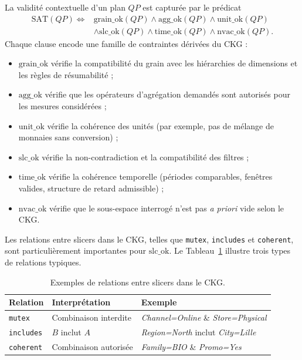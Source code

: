 \documentclass[journal]{IEEEtran}
\begin{document}
La validité contextuelle d'un plan $QP$ est capturée par le prédicat
\begin{equation}
\label{eq:sat}
\begin{aligned}
\mathrm{SAT}(QP) \Leftrightarrow {} & \mathrm{grain\_ok}(QP)\wedge \mathrm{agg\_ok}(QP)\wedge \mathrm{unit\_ok}(QP) \\
& \wedge \mathrm{slc\_ok}(QP)\wedge \mathrm{time\_ok}(QP)\wedge \mathrm{nvac\_ok}(QP).
\end{aligned}
\end{equation}
Chaque clause encode une famille de contraintes dérivées du CKG :
\begin{itemize}
  \item $\mathrm{grain\_ok}$ vérifie la compatibilité du grain avec les hiérarchies de dimensions et les règles de résumabilité ;
  \item $\mathrm{agg\_ok}$ vérifie que les opérateurs d'agrégation demandés sont autorisés pour les mesures considérées ;
  \item $\mathrm{unit\_ok}$ vérifie la cohérence des unités (par exemple, pas de mélange de monnaies sans conversion) ;
  \item $\mathrm{slc\_ok}$ vérifie la non-contradiction et la compatibilité des filtres ;
  \item $\mathrm{time\_ok}$ vérifie la cohérence temporelle (périodes comparables, fenêtres valides, structure de retard admissible) ;
  \item $\mathrm{nvac\_ok}$ vérifie que le sous-espace interrogé n'est pas \emph{a priori} vide selon le CKG.
\end{itemize}

Les relations entre slicers dans le CKG, telles que \texttt{mutex}, \texttt{includes} et \texttt{coherent}, sont particulièrement importantes pour $\mathrm{slc\_ok}$. Le Tableau~\ref{tab:slicers} illustre trois types de relations typiques.

\begin{table}[!t]
\centering
\caption{Exemples de relations entre slicers dans le CKG.}
\begin{tabular}{@{}lll@{}}
\toprule
Relation & Interprétation & Exemple \\
\midrule
\texttt{mutex} & Combinaison interdite & \textit{Channel=Online} \& \textit{Store=Physical} \\
\texttt{includes} & $B$ inclut $A$ & \textit{Region=North} inclut \textit{City=Lille} \\
\texttt{coherent} & Combinaison autorisée & \textit{Family=BIO} \& \textit{Promo=Yes} \\
\bottomrule
\end{tabular}
\label{tab:slicers}
\end{table}
\end{document}
